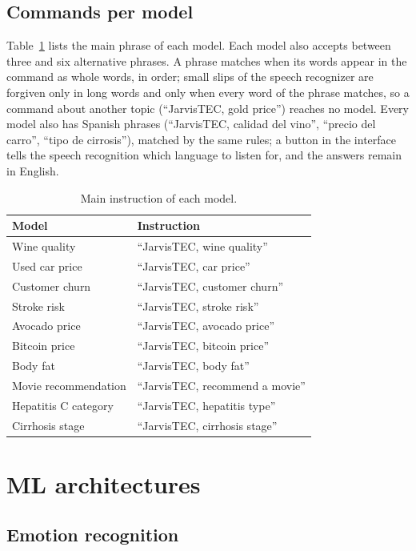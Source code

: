 \documentclass[11pt,letterpaper]{article}
\begin{document}
\subsection{Commands per model}

Table~\ref{tab:commands} lists the main phrase of each model. Each model also accepts between three and six alternative phrases. A phrase matches when its words appear in the command as whole words, in order; small slips of the speech recognizer are forgiven only in long words and only when every word of the phrase matches, so a command about another topic (``JarvisTEC, gold price'') reaches no model. Every model also has Spanish phrases (``JarvisTEC, calidad del vino'', ``precio del carro'', ``tipo de cirrosis''), matched by the same rules; a button in the interface tells the speech recognition which language to listen for, and the answers remain in English.

\begin{table}[H]
\centering
\caption{Main instruction of each model.}
\label{tab:commands}
\begin{tabularx}{\textwidth}{lX}
\toprule
Model & Instruction \\
\midrule
Wine quality & ``JarvisTEC, wine quality'' \\
Used car price & ``JarvisTEC, car price'' \\
Customer churn & ``JarvisTEC, customer churn'' \\
Stroke risk & ``JarvisTEC, stroke risk'' \\
Avocado price & ``JarvisTEC, avocado price'' \\
Bitcoin price & ``JarvisTEC, bitcoin price'' \\
Body fat & ``JarvisTEC, body fat'' \\
Movie recommendation & ``JarvisTEC, recommend a movie'' \\
Hepatitis C category & ``JarvisTEC, hepatitis type'' \\
Cirrhosis stage & ``JarvisTEC, cirrhosis stage'' \\
\bottomrule
\end{tabularx}
\end{table}

\section{ML architectures}

\subsection{Emotion recognition}
\end{document}
